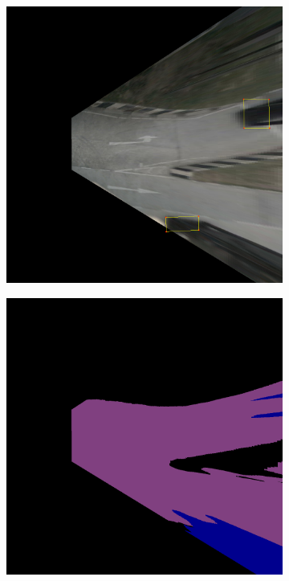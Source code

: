 \begin{figure}[h!]
    \centering
    \begin{subfigure}[b]{0.3\textwidth}
        \includegraphics[width=\textwidth]{images/methodology/bev_occupancy_oclusion/bev_cuboid_9.png}
        \caption{}
        \label{fig:bev_occupancy_occlusion_a}
    \end{subfigure}
    \hfill
    \begin{subfigure}[b]{0.3\textwidth}
        \includegraphics[width=\textwidth]{images/methodology/bev_occupancy_oclusion/bev_semantic_color_9.png}

\end{subfigure}
\end{figure}
